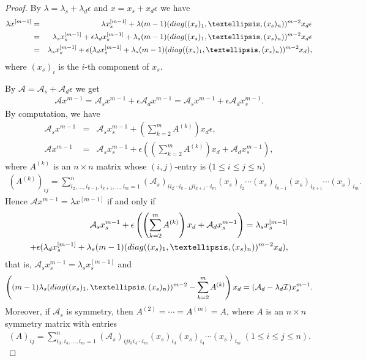 \documentclass[10pt,a4paper]{amsart}
\begin{document}
\begin{proof}
By $\lambda=\lambda_s+\lambda_d\epsilon$ and $x=x_s+x_d\epsilon$ we have
\begin{eqnarray*}
\lambda x^{[m-1]}&=&\lambda x_s^{[m-1]}+\lambda(m-1)({\rm diag}((x_s)_1,\ldots,(x_s)_n))^{m-2}x_d\epsilon\\
&=&\lambda_sx_s^{[m-1]}+\epsilon\lambda_dx_s^{[m-1]}+\lambda_s(m-1)({\rm diag}((x_s)_1,\ldots,(x_s)_n))^{m-2}x_d\epsilon\\
&=&\lambda_sx_s^{[m-1]}+\epsilon(\lambda_dx_s^{[m-1]}+\lambda_s(m-1)({\rm diag}((x_s)_1,\ldots,(x_s)_n))^{m-2}x_d),
\end{eqnarray*}
where $(x_s)_i$ is the $i$-th component of $x_s$.

By $\mathcal{A}=\mathcal{A}_s+\mathcal{A}_d\epsilon$ we get
\begin{eqnarray*}
\mathcal{A}x^{m-1}=\mathcal{A}_sx^{m-1}+\epsilon\mathcal{A}_dx^{m-1}=\mathcal{A}_sx^{m-1}+\epsilon\mathcal{A}_dx_s^{m-1}.
\end{eqnarray*}
By computation, we have
\begin{eqnarray*}
\mathcal{A}_sx^{m-1}&=&\mathcal{A}_sx_s^{m-1}+\left(\sum_{k=2}^mA^{(k)}\right)x_d\epsilon,\\
\mathcal{A}x^{m-1}&=&\mathcal{A}_sx_s^{m-1}+\epsilon\left(\left(\sum_{k=2}^mA^{(k)}\right)x_d+\mathcal{A}_dx_s^{m-1}\right),
\end{eqnarray*}
where $A^{(k)}$ is an $n\times n$ matrix whose $(i,j)$-entry is ($1\leq i\leq j\leq n$)
\begin{eqnarray*}
(A^{(k)})_{ij}=\sum_{i_2,\ldots,i_{k-1},i_{k+1},\ldots,i_m=1}^n(\mathcal{A}_s)_{ii_2\cdots i_{k-1}ji_{k+1}\cdots i_m}(x_s)_{i_2}\cdots (x_s)_{i_{k-1}}(x_s)_{i_{k+1}}\cdots(x_s)_{i_m}.
\end{eqnarray*}
Hence $\mathcal{A}x^{m-1}=\lambda x^{[m-1]}$ if and only if
\begin{eqnarray*}
\mathcal{A}_sx_s^{m-1}+\epsilon\left(\left(\sum_{k=2}^mA^{(k)}\right)x_d+\mathcal{A}_dx_s^{m-1}\right)=\lambda_sx_s^{[m-1]}\\
+\epsilon(\lambda_dx_s^{[m-1]}+\lambda_s(m-1)({\rm diag}((x_s)_1,\ldots,(x_s)_n))^{m-2}x_d),
\end{eqnarray*}
that is, $\mathcal{A}_sx_s^{m-1}=\lambda_sx_s^{[m-1]}$ and
\begin{eqnarray*}
\left((m-1)\lambda_s({\rm diag}((x_s)_1,\ldots,(x_s)_n))^{m-2}-\sum_{k=2}^mA^{(k)}\right)x_d=(\mathcal{A}_d-\lambda_d\mathcal{I})x_s^{m-1}.
\end{eqnarray*}
Moreover, if $\mathcal{A}_s$ is symmetry, then $A^{(2)}=\cdots=A^{(m)}=A$, where $A$ is an $n\times n$ symmetry matrix with entries
\begin{eqnarray*}
(A)_{ij}=\sum_{i_3,i_4,\ldots,i_m=1}^n(\mathcal{A}_s)_{iji_3i_4\cdots i_m}(x_s)_{i_3}(x_s)_{i_4}\cdots(x_s)_{i_m}~(1\leq i\leq j\leq n).
\end{eqnarray*}
\end{proof}
\end{document}
